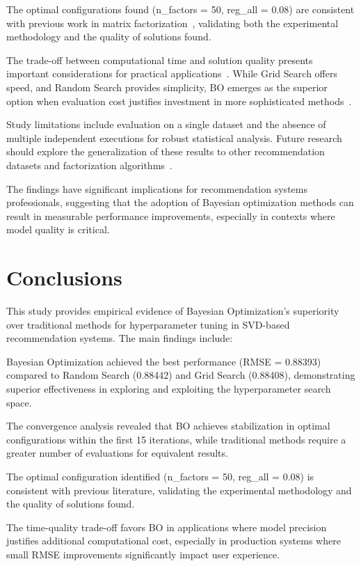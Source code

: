 \documentclass[conference]{IEEEtran}
\begin{document}
The optimal configurations found (n\_factors = 50, reg\_all = 0.08) are consistent with previous work in matrix factorization~\cite{takacs2009major}, validating both the experimental methodology and the quality of solutions found.

The trade-off between computational time and solution quality presents important considerations for practical applications~\cite{gonzalez2016gpyopt}. While Grid Search offers speed, and Random Search provides simplicity, BO emerges as the superior option when evaluation cost justifies investment in more sophisticated methods~\cite{feurer2015efficient}.

Study limitations include evaluation on a single dataset and the absence of multiple independent executions for robust statistical analysis. Future research should explore the generalization of these results to other recommendation datasets and factorization algorithms~\cite{li2020hyperband}.

The findings have significant implications for recommendation systems professionals, suggesting that the adoption of Bayesian optimization methods can result in measurable performance improvements, especially in contexts where model quality is critical.

\section{Conclusions}

This study provides empirical evidence of Bayesian Optimization's superiority over traditional methods for hyperparameter tuning in SVD-based recommendation systems. The main findings include:

Bayesian Optimization achieved the best performance (RMSE = 0.88393) compared to Random Search (0.88442) and Grid Search (0.88408), demonstrating superior effectiveness in exploring and exploiting the hyperparameter search space.

The convergence analysis revealed that BO achieves stabilization in optimal configurations within the first 15 iterations, while traditional methods require a greater number of evaluations for equivalent results.

The optimal configuration identified (n\_factors = 50, reg\_all = 0.08) is consistent with previous literature, validating the experimental methodology and the quality of solutions found.

The time-quality trade-off favors BO in applications where model precision justifies additional computational cost, especially in production systems where small RMSE improvements significantly impact user experience.
\end{document}
